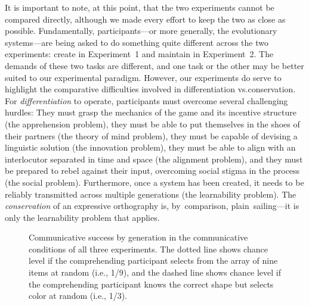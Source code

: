 \documentclass[doc,biblatex]{apa7}
\begin{document}
It is important to note, at this point, that the two experiments cannot be compared directly, although we made every effort to keep the two as close as possible. Fundamentally, participants---or more generally, the evolutionary systems---are being asked to do something quite different across the two experiments: create in Experiment~1 and maintain in Experiment~2. The demands of these two tasks are different, and one task or the other may be better suited to our experimental paradigm. However, our experiments do serve to highlight the comparative difficulties involved in differentiation vs.\@ conservation. For \textit{differentiation} to operate, participants must overcome several challenging hurdles: They must grasp the mechanics of the game and its incentive structure (the apprehension problem), they must be able to put themselves in the shoes of their partners (the theory of mind problem), they must be capable of devising a linguistic solution (the innovation problem), they must be able to align with an interlocutor separated in time and space (the alignment problem), and they must be prepared to rebel against their input, overcoming social stigma in the process (the social problem). Furthermore, once a system has been created, it needs to be reliably transmitted across multiple generations (the learnability problem). The \textit{conservation} of an expressive orthography is, by~comparison, plain~sailing---it is only the learnability problem that applies.

	\begin{figure}
	\vspace*{2pt}
	\caption{Communicative success by generation in the communicative conditions of all three experiments. The dotted line shows chance level if the comprehending participant selects from the array of nine items at random (i.e., 1/9), and the dashed line shows chance level if the comprehending participant knows the correct shape but selects color at random (i.e., 1/3).}
	\label{success}
	\end{figure}
\end{document}
